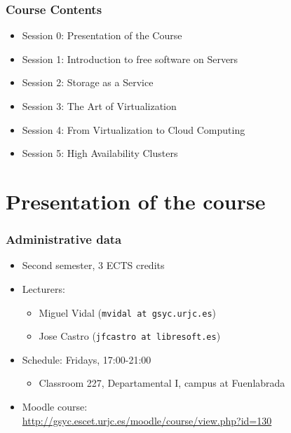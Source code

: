 \documentclass{beamer}
\begin{document}


\normalsize


\begin{frame}
  \frametitle{Course Contents}

  \begin{itemize}
    \item \alert{Session 0: Presentation of the Course}
    \item Session 1: Introduction to free software on Servers
    \item Session 2: Storage as a Service
    \item Session 3: The Art of Virtualization
    \item Session 4: From Virtualization to Cloud Computing
    \item Session 5: High Availability Clusters
  \end{itemize}

\end{frame}


\section{Presentation of the course}


\begin{frame}
\frametitle{Administrative data}

\begin{itemize}
\item Second semester, 3 ECTS credits
\item Lecturers:
  \begin{itemize}
  \item \alert{Miguel Vidal} (\texttt{mvidal at gsyc.urjc.es})
  \item \alert{Jose Castro} (\texttt{jfcastro at libresoft.es})
  \end{itemize}
\item Schedule: \alert{Fridays, 17:00-21:00}
  \begin{itemize}
  \item Classroom 227, Departamental I, campus at Fuenlabrada
  \end{itemize}
\item Moodle course: \\
  {\footnotesize\url{http://gsyc.escet.urjc.es/moodle/course/view.php?id=130}}
\end{itemize}
\end{frame}
\end{document}
